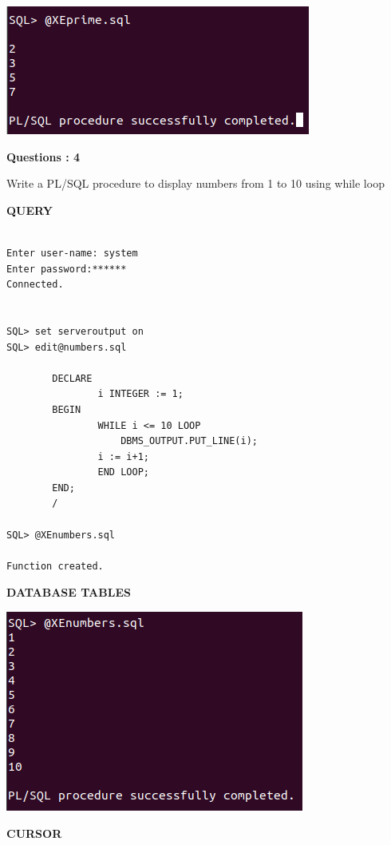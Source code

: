 \documentclass[a4paper,12pt]{report}
\begin{document}
\includegraphics[scale=0.7]{PRIME.png}


\begin{flushleft}
    \textbf{Questions : 4}
\end{flushleft}
Write a PL/SQL procedure to display numbers from 1 to 10 using while loop
\begin{flushleft}
		\textbf{QUERY }
	\end{flushleft}
 \begin{verbatim}

Enter user-name: system
Enter password:******
Connected.


SQL> set serveroutput on
SQL> edit@numbers.sql

		DECLARE
    			i INTEGER := 1;
		BEGIN
    			WHILE i <= 10 LOOP 
        			DBMS_OUTPUT.PUT_LINE(i);
    			i := i+1;
    			END LOOP;
		END;
		/

SQL> @XEnumbers.sql

Function created.

\end{verbatim}
\begin{flushleft}
		\textbf{DATABASE TABLES} 
\end{flushleft} 

\includegraphics[scale=0.7]{NUMBERS.png}

\newpage
\begin{center}
\large\textbf{CURSOR}
\end{center}
\end{document}
